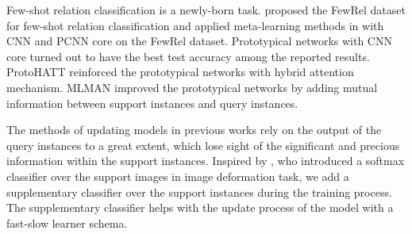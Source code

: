 Few-shot relation classification is a newly-born task. \citet{han-etal-2018-fewrel} proposed the FewRel dataset for few-shot relation classification and applied meta-learning methods in \citep{metanet, snail, proto} with CNN and PCNN core on the FewRel dataset. Prototypical networks \citep{proto} with CNN core turned out to have the best test accuracy among the reported results. ProtoHATT \citep{hatt} reinforced the prototypical networks with hybrid attention mechanism. MLMAN \citep{ye-ling-2019-multi} improved the prototypical networks by adding mutual information between support instances and query instances.

The methods of updating models in previous works rely on the output of the query instances to a great extent, which lose sight of the significant and precious information within the support instances. Inspired by \citet{chen-2019-image}, who introduced a softmax classifier over the support images in image deformation task, we add a supplementary classifier over the support instances during the training process. The supplementary classifier helps with the update process of the model with a fast-slow learner schema.


